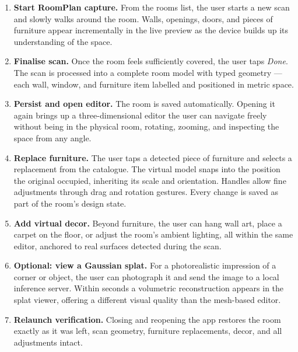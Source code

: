 \begin{enumerate}
    \item \textbf{Start RoomPlan capture.} From the rooms list, the user starts
    a new scan and slowly walks around the room. Walls, openings, doors, and
    pieces of furniture appear incrementally in the live preview as the device
    builds up its understanding of the space.

    \item \textbf{Finalise scan.} Once the room feels sufficiently covered,
    the user taps \emph{Done}. The scan is processed into a complete room model
    with typed geometry — each wall, window, and furniture item labelled and
    positioned in metric space.

    \item \textbf{Persist and open editor.} The room is saved automatically.
    Opening it again brings up a three-dimensional editor the user can navigate
    freely without being in the physical room, rotating, zooming, and inspecting
    the space from any angle.

    \item \textbf{Replace furniture.} The user taps a detected piece of
    furniture and selects a replacement from the catalogue. The virtual model
    snaps into the position the original occupied, inheriting its scale and
    orientation. Handles allow fine adjustments through drag and rotation
    gestures. Every change is saved as part of the room's design state.

    \item \textbf{Add virtual decor.} Beyond furniture, the user can hang wall
    art, place a carpet on the floor, or adjust the room's ambient lighting,
    all within the same editor, anchored to real surfaces detected during the
    scan.

    \item \textbf{Optional: view a Gaussian splat.} For a photorealistic
    impression of a corner or object, the user can photograph it and send the
    image to a local inference server. Within seconds a volumetric reconstruction
    appears in the splat viewer, offering a different visual quality than the
    mesh-based editor.

    \item \textbf{Relaunch verification.} Closing and reopening the app
    restores the room exactly as it was left, scan geometry, furniture
    replacements, decor, and all adjustments intact.
\end{enumerate}

